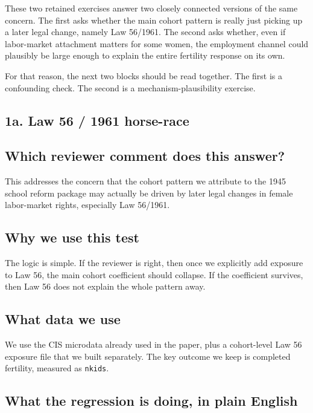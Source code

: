 \documentclass[11pt]{article}
\begin{document}
These two retained exercises answer two closely connected versions of the same concern. The first asks whether the main cohort pattern is really just picking up a later legal change, namely Law 56/1961. The second asks whether, even if labor-market attachment matters for some women, the employment channel could plausibly be large enough to explain the entire fertility response on its own.

For that reason, the next two blocks should be read together. The first is a confounding check. The second is a mechanism-plausibility exercise.

\subsection*{1a. Law 56 / 1961 horse-race}\label{sec:law56-1a}

\subsection*{Which reviewer comment does this answer?}

This addresses the concern that the cohort pattern we attribute to the 1945 school reform package may actually be driven by later legal changes in female labor-market rights, especially Law 56/1961.

\subsection*{Why we use this test}

The logic is simple. If the reviewer is right, then once we explicitly add exposure to Law 56, the main cohort coefficient should collapse. If the coefficient survives, then Law 56 does not explain the whole pattern away.

\subsection*{What data we use}

We use the CIS microdata already used in the paper, plus a cohort-level Law 56 exposure file that we built separately. The key outcome we keep is completed fertility, measured as \texttt{nkids}.

\subsection*{What the regression is doing, in plain English}
\end{document}
